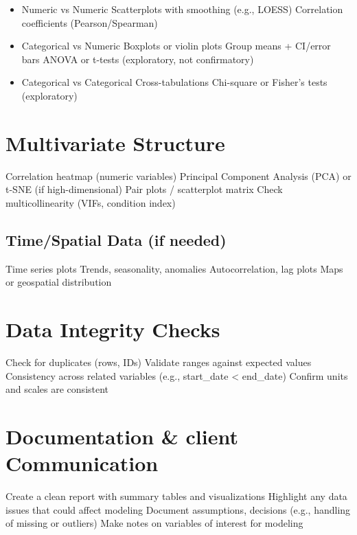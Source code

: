 \documentclass[
  11pt,
  letterpaper,
  DIV=11,
  numbers=noendperiod]{scrartcl}
\providecommand{\tightlist}{%
  \setlength{\itemsep}{0pt}\setlength{\parskip}{0pt}}\usepackage{longtable,booktabs,array}
\begin{document}
\begin{itemize}
\tightlist
\item
  Numeric vs Numeric Scatterplots with smoothing (e.g., LOESS)
  Correlation coefficients (Pearson/Spearman)
\item
  Categorical vs Numeric Boxplots or violin plots Group means + CI/error
  bars ANOVA or t-tests (exploratory, not confirmatory)
\item
  Categorical vs Categorical Cross-tabulations Chi-square or Fisher's
  tests (exploratory)
\end{itemize}

\section{Multivariate Structure}\label{multivariate-structure}

Correlation heatmap (numeric variables) Principal Component Analysis
(PCA) or t-SNE (if high-dimensional) Pair plots / scatterplot matrix
Check multicollinearity (VIFs, condition index)

\subsection{Time/Spatial Data (if
needed)}\label{timespatial-data-if-needed}

Time series plots Trends, seasonality, anomalies Autocorrelation, lag
plots Maps or geospatial distribution

\section{Data Integrity Checks}\label{data-integrity-checks}

Check for duplicates (rows, IDs) Validate ranges against expected values
Consistency across related variables (e.g., start\_date \textless{}
end\_date) Confirm units and scales are consistent

\section{Documentation \& client
Communication}\label{documentation-client-communication}

Create a clean report with summary tables and visualizations Highlight
any data issues that could affect modeling Document assumptions,
decisions (e.g., handling of missing or outliers) Make notes on
variables of interest for modeling
\end{document}
